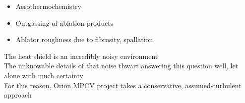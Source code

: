 \documentclass[mathserif]{beamer}
\begin{document}
\begin{frame}{}
\begin{columns}
\begin{column}{0.75\textwidth}
\begin{description}[Q]
\begin{itemize}
        \item Aerothermochemistry
        \item Outgassing of ablation products
        \item Ablator roughness due to fibrosity, spallation
      \end{itemize}
  \end{description}
  \vspace{1em}
  The heat shield is an incredibly noisy environment
  \\\vspace{1em}
  The unknowable details of that noise thwart answering
  this question well, let alone with much certainty
  \\\vspace{1em}
  For this reason, Orion MPCV project takes a conservative, assumed-turbulent
  approach
  \end{column}
\end{columns}
\end{frame}
\end{document}
